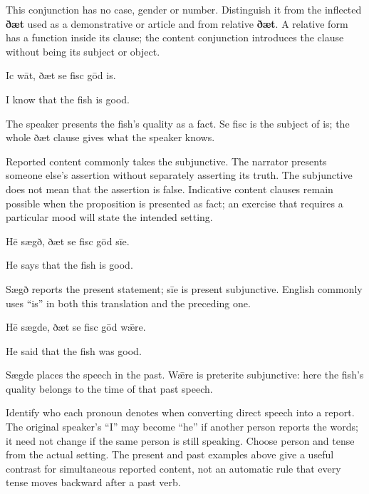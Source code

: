 This conjunction has no case, gender or number. Distinguish it from the inflected \textbf{ðæt} used as a demonstrative or article and from relative \textbf{ðæt}. A relative form has a function inside its clause; the content conjunction introduces the clause without being its subject or object.

Ic wāt, ðæt se fisc gōd is.

I know that the fish is good.

The speaker presents the fish’s quality as a fact. Se fisc is the subject of is; the whole ðæt clause gives what the speaker knows.

Reported content commonly takes the subjunctive. The narrator presents someone else’s assertion without separately asserting its truth. The subjunctive does not mean that the assertion is false. Indicative content clauses remain possible when the proposition is presented as fact; an exercise that requires a particular mood will state the intended setting.

Hē sægð, ðæt se fisc gōd sīe.

He says that the fish is good.

Sægð reports the present statement; sīe is present subjunctive. English commonly uses “is” in both this translation and the preceding one.

Hē sægde, ðæt se fisc gōd wǣre.

He said that the fish was good.

Sægde places the speech in the past. Wǣre is preterite subjunctive: here the fish’s quality belongs to the time of that past speech.

Identify who each pronoun denotes when converting direct speech into a report. The original speaker’s “I” may become “he” if another person reports the words; it need not change if the same person is still speaking. Choose person and tense from the actual setting. The present and past examples above give a useful contrast for simultaneous reported content, not an automatic rule that every tense moves backward after a past verb.

